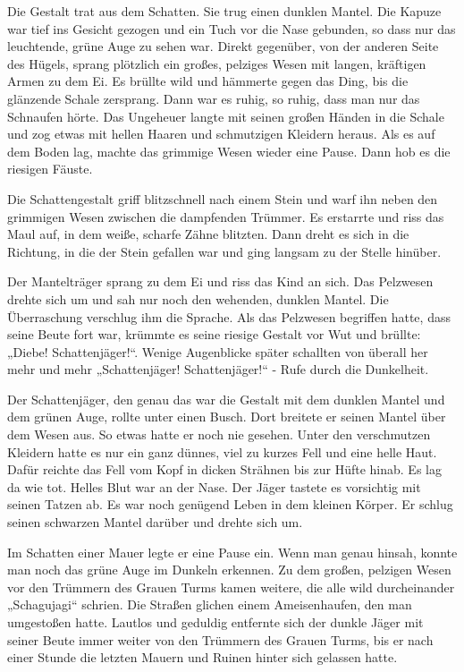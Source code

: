 \documentclass[12pt,a4paper,onecolumn,twoside,ngerman]{book}
\begin{document}
Die Gestalt trat aus dem Schatten. Sie trug einen dunklen Mantel. Die Kapuze war tief ins Gesicht gezogen und ein Tuch vor die Nase gebunden, so dass nur das leuchtende, grüne Auge zu sehen war. Direkt gegenüber, von der anderen Seite des Hügels, sprang plötzlich ein großes, pelziges Wesen mit langen, kräftigen Armen zu dem Ei. Es brüllte wild und hämmerte gegen das Ding, bis die glänzende Schale zersprang. Dann war es ruhig, so ruhig, dass man nur das Schnaufen hörte. Das Ungeheuer langte mit seinen großen Händen in die Schale und zog etwas mit hellen Haaren und schmutzigen Kleidern heraus. Als es auf dem Boden lag, machte das grimmige Wesen wieder eine Pause. Dann hob es die riesigen Fäuste. 

Die Schattengestalt griff blitzschnell nach einem Stein und warf ihn neben den grimmigen Wesen zwischen die dampfenden Trümmer. Es erstarrte und riss das Maul auf, in dem weiße, scharfe Zähne blitzten. Dann dreht es sich in die Richtung, in die der Stein gefallen war und ging langsam zu der Stelle hinüber. 

Der Mantelträger sprang zu dem Ei und riss das Kind an sich. Das Pelzwesen drehte sich um und sah nur noch den wehenden, dunklen Mantel. Die Überraschung verschlug ihm die Sprache. Als das Pelzwesen begriffen hatte, dass seine Beute fort war, krümmte es seine riesige Gestalt vor Wut und brüllte: „Diebe! Schattenjäger!“. Wenige Augenblicke später schallten von überall her mehr und mehr „Schattenjäger! Schattenjäger!“ - Rufe durch die Dunkelheit.

Der Schattenjäger, den genau das war die Gestalt mit dem dunklen Mantel und dem grünen Auge, rollte unter einen Busch. Dort breitete er seinen Mantel über dem Wesen aus. So etwas hatte er noch nie gesehen. Unter den verschmutzen Kleidern hatte es nur ein ganz dünnes, viel zu kurzes Fell und eine helle Haut. Dafür reichte das Fell vom Kopf in dicken Strähnen bis zur Hüfte hinab. Es lag da wie tot. Helles Blut war an der Nase. Der Jäger tastete es vorsichtig mit seinen Tatzen ab. Es war noch genügend Leben in dem kleinen Körper. Er schlug seinen schwarzen Mantel darüber und drehte sich um.

Im Schatten einer Mauer legte er eine Pause ein. Wenn man genau hinsah, konnte man noch das grüne Auge im Dunkeln erkennen. Zu dem großen, pelzigen Wesen vor den Trümmern des Grauen Turms kamen weitere, die alle wild durcheinander „Schagujagi“ schrien. Die Straßen glichen einem Ameisenhaufen, den man umgestoßen hatte. Lautlos und geduldig entfernte sich der dunkle Jäger mit seiner Beute immer weiter von den Trümmern des Grauen Turms, bis er nach einer Stunde die letzten Mauern und Ruinen hinter sich gelassen hatte.
\end{document}
